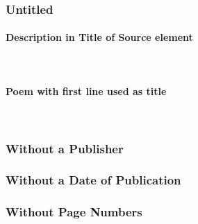 \documentclass{ltxdockit}
\newcommand{\myparagraph}[1]{\paragraph{#1}\mbox{}\\}
\begin{document}
\subsubsection{Untitled} %
\label{sub:untitled}
\myparagraph{Description in Title of Source element} %
\label{ssub:description_in_title_of_source_element}
\begin{refsection}
	\printbibliography[heading=none]
\end{refsection}
\myparagraph{Poem with first line used as title} %
\label{ssub:poem_with_first_line_used_as_title}
\begin{refsection}
	\printbibliography[heading=none]
\end{refsection}

\subsubsection{Without a Publisher} %
\label{sub:without_a_publisher}
\begin{refsection}
	\printbibliography[heading=none]
\end{refsection}
\subsubsection{Without a Date of Publication} %
\label{sub:without_a_date_of_publication}
\begin{refsection}
	\printbibliography[heading=none]
\end{refsection}
\subsubsection{Without Page Numbers} %
\label{sub:without_page_numbers}
\begin{refsection}
	\printbibliography[heading=none]
\end{refsection}

\end{document}
